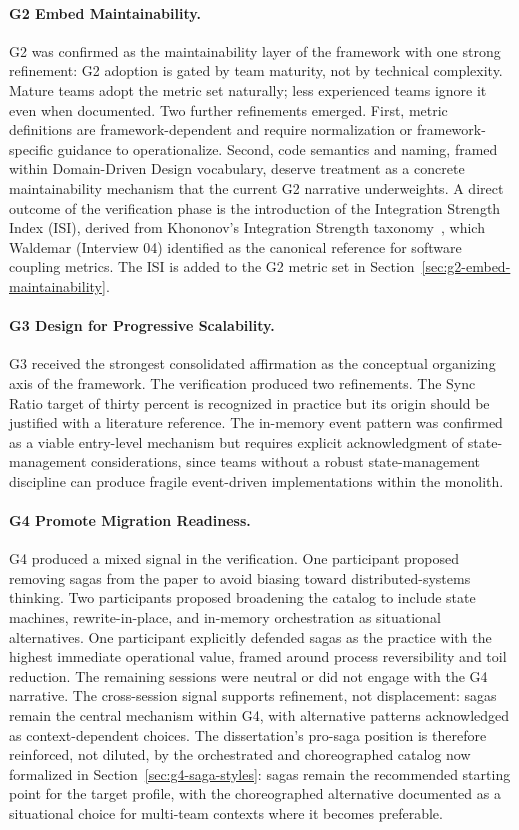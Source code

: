 \paragraph*{G2 Embed Maintainability.} G2 was confirmed as the maintainability layer of the framework with one strong refinement: G2 adoption is gated by team maturity, not by technical complexity. Mature teams adopt the metric set naturally; less experienced teams ignore it even when documented. Two further refinements emerged. First, metric definitions are framework-dependent and require normalization or framework-specific guidance to operationalize. Second, code semantics and naming, framed within Domain-Driven Design vocabulary, deserve treatment as a concrete maintainability mechanism that the current G2 narrative underweights. A direct outcome of the verification phase is the introduction of the Integration Strength Index (ISI), derived from Khononov's Integration Strength taxonomy~\cite{khononov2024balancing}, which Waldemar (Interview 04) identified as the canonical reference for software coupling metrics. The ISI is added to the G2 metric set in Section~\ref{sec:g2-embed-maintainability}.

\paragraph*{G3 Design for Progressive Scalability.} G3 received the strongest consolidated affirmation as the conceptual organizing axis of the framework. The verification produced two refinements. The Sync Ratio target of thirty percent is recognized in practice but its origin should be justified with a literature reference. The in-memory event pattern was confirmed as a viable entry-level mechanism but requires explicit acknowledgment of state-management considerations, since teams without a robust state-management discipline can produce fragile event-driven implementations within the monolith.

\paragraph*{G4 Promote Migration Readiness.} G4 produced a mixed signal in the verification. One participant proposed removing sagas from the paper to avoid biasing toward distributed-systems thinking. Two participants proposed broadening the catalog to include state machines, rewrite-in-place, and in-memory orchestration as situational alternatives. One participant explicitly defended sagas as the practice with the highest immediate operational value, framed around process reversibility and toil reduction. The remaining sessions were neutral or did not engage with the G4 narrative. The cross-session signal supports refinement, not displacement: sagas remain the central mechanism within G4, with alternative patterns acknowledged as context-dependent choices. The dissertation's pro-saga position is therefore reinforced, not diluted, by the orchestrated and choreographed catalog now formalized in Section~\ref{sec:g4-saga-styles}: sagas remain the recommended starting point for the target profile, with the choreographed alternative documented as a situational choice for multi-team contexts where it becomes preferable.


